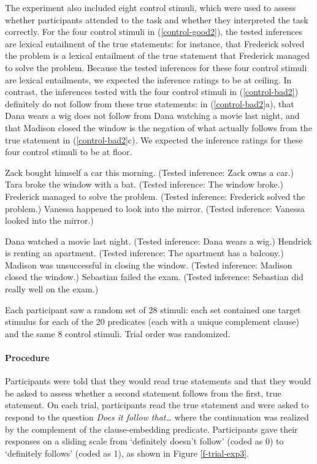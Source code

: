 \documentclass[11pt,fleqn]{article}
\newcommand{\6}{\mbox{$[\hspace*{-.6mm}[$}}
\newcommand{\9}{\mbox{$]\hspace*{-.6mm}]$}}
\begin{document}
The experiment also included eight control stimuli, which were used to assess whether participants attended to the task and whether they interpreted the task correctly. For the four control stimuli in (\ref{control-good2}), the tested inferences are lexical entailment of the true statements: for instance, that Frederick solved the problem is a lexical entailment of the true statement that Frederick managed to solve the problem. Because the tested inferences for these four control stimuli are lexical entailments, we expected the inference ratings to be at ceiling. In contrast, the inferences tested with the four control stimuli in (\ref{control-bad2}) definitely do not follow from these true statements: in (\ref{control-bad2}a), that Dana wears a wig does not follow from Dana watching a movie last night, and that Madison closed the window is the negation of what actually follows from the true statement in (\ref{control-bad2}c). We expected the inference ratings for these four control stimuli to be at floor.

\begin{exe}
\ex\label{control-good2}
\begin{xlist}
 Zack bought himself a car this morning. (Tested inference: Zack owns a car.)
 Tara broke the window with a bat. (Tested inference: The window broke.)
 Frederick managed to solve the problem. (Tested inference: Frederick solved the problem.)
 Vanessa happened to look into the mirror. (Tested inference: Vanessa looked into the mirror.)
\end{xlist}
\ex\label{control-bad2}
\begin{xlist}
 Dana watched a movie last night. (Tested inference: Dana wears a wig.)
 Hendrick is renting an apartment. (Tested inference: The apartment has a balcony.)
 Madison was unsuccessful in closing the window. (Tested inference:  Madison closed the window.)
 Sebastian failed the exam. (Tested inference: Sebastian did really well on the exam.)
\end{xlist}
\end{exe}

Each participant saw a random set of 28 stimuli: each set contained one target stimulus for each of the 20 predicates (each with a unique complement clause) and the same 8 control stimuli. Trial order was randomized.

\paragraph{Procedure} Participants were told that they would read true statements and that they would be asked to assess whether a second statement follows from the first, true statement. On each trial, participants read the true statement and were asked to respond to the question {\em Does it follow that\ldots} where the continuation was realized by the complement of the clause-embedding predicate. Participants gave their responses on a sliding scale from `definitely doesn't follow' (coded as 0) to `definitely follows' (coded as 1), as shown in Figure \ref{f-trial-exp3}.
\end{document}
